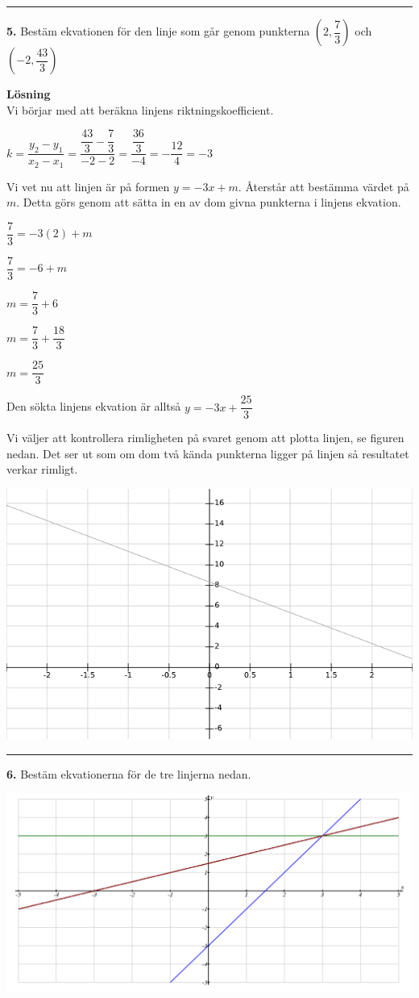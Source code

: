 \documentclass{article}
\begin{document}
\noindent\rule[0.5ex]{\linewidth}{0.5pt}
\textbf{5.} Bestäm ekvationen för den linje som går genom punkterna $(2,\dfrac{7}{3})$ och $(-2,\dfrac{43}{3})$

\textbf{Lösning}\\
Vi börjar med att beräkna linjens riktningskoefficient.

$k=\dfrac{y_{2}-y_{1}}{x_{2}-x_{1}}=\dfrac{\dfrac{43}{3}-\dfrac{7}{3}}{-2-2}=\dfrac{\dfrac{36}{3}}{-4}=-\dfrac{12}{4}=-3$

Vi vet nu att linjen är på formen $y=-3x+m$. Återstår att bestämma värdet på $m$. Detta görs genom att sätta in en av dom givna punkterna i linjens ekvation.

$\dfrac{7}{3}=-3(2)+m$

$\dfrac{7}{3}=-6+m$

$m=\dfrac{7}{3}+6$

$m=\dfrac{7}{3}+\dfrac{18}{3}$

$m=\dfrac{25}{3}$

Den sökta linjens ekvation är alltså $y=-3x+\dfrac{25}{3}$

Vi väljer att kontrollera rimligheten på svaret genom att plotta linjen, se figuren nedan. Det ser ut som om dom två kända punkterna ligger på linjen så resultatet verkar rimligt.

\includegraphics[scale=0.65]{graph_1_5_1.png}

\noindent\rule[0.5ex]{\linewidth}{0.5pt}
\textbf{6.} Bestäm ekvationerna för de tre linjerna nedan.

\includegraphics[scale=0.36]{graph_1_6_1.png}
\end{document}
